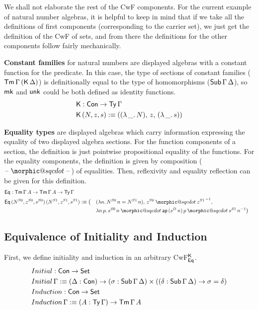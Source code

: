 \documentclass[acmsmall,screen]{acmart}
\makeatletter
\DeclareRobustCommand{\sqcdot}{\mathbin{\mathpalette\morphic@sqcdot\relax}}
\newcommand{\morphic@sqcdot}[2]{%
  \sbox\z@{$\m@th#1\centerdot$}%
  \ht\z@=.33333\ht\z@
  \vcenter{\box\z@}%
}
\makeatother
\begin{document}
We shall not elaborate the rest of the CwF components. For the current
example of natural number algebras, it is helpful to keep in mind that
if we take all the definitions of first components (corresponding to
the carrier set), we just get the definition of the CwF of sets, and
from there the definitions for the other components follow fairly
mechanically.

\textbf{Constant families} for natural numbers are displayed algebras
with a constant function for the predicate. In this case, the type of
sections of constant families ($\mathsf{Tm}\,\Gamma\,(\mathsf{K}\,\Delta)$) is
definitionally equal to the type of homomorphisms
($\mathsf{Sub}\,\Gamma\,\Delta$), so $\mathsf{mk}$ and $\mathsf{unk}$ could be both defined as
identity functions.
\begin{alignat*}{5}
  & \mathsf{K} : \mathsf{Con} \rightarrow \mathsf{Ty}\,\Gamma \\
  & \mathsf{K}\,(N, z, s) :\equiv ((\lambda\,\_.\,N),\,z,\,(\lambda\,\_.\,s))
\end{alignat*}

\textbf{Equality types} are displayed algebras which carry information
expressing the equality of two displayed algebra sections. For the
function components of a section, the definition is just pointwise
propositional equality of the functions. For the equality components,
the definition is given by composition ($\blank\sqcdot\blank$) of
equalities. Then, reflexivity and equality reflection can be given
for this definition.
\begin{alignat*}{5}
  & \Eq : \Tm\,\Gamma\,A\ra\Tm\,\Gamma\,A\ra\Ty\,\Gamma \\
  & \Eq\,(N^{S0},z^{S0},s^{S0})\,(N^{S1},z^{S1},s^{S1}) :\equiv \big( && (\lambda n.\,{N^{S0}}\,n = {N^{S1}}\,n),\,z^{S0}\sqcdot {z^{S1}}^{\,-1},\, \\
  & && \lambda n\,p.\,s^{S0}\,n\sqcdot \ap\,(s^D\,n)\,p\sqcdot s^{S1}\,n^{-1}\big)
\end{alignat*}

\subsection{Equivalence of Initiality and Induction}
\label{sec:initind}

First, we define initiality and induction in an arbitrary CwF$^{\mathsf{K}}_{\mathsf{Eq}}$.
\begin{alignat*}{5}
  & Initial : \mathsf{Con} \rightarrow \mathsf{Set} \\
  & Initial\,\Gamma :\equiv (\Delta : \mathsf{Con}) \rightarrow (\sigma : \mathsf{Sub}\,\Gamma\,\Delta)\times((\delta : \mathsf{Sub}\,\Gamma\,\Delta)\rightarrow\sigma=\delta) \\
  & Induction : \mathsf{Con} \rightarrow \mathsf{Set} \\
  & Induction\,\Gamma :\equiv (A : \mathsf{Ty}\,\Gamma)\rightarrow\mathsf{Tm}\,\Gamma\,A
\end{alignat*}
\end{document}
